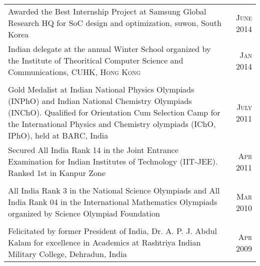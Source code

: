 \documentclass[a4paper,8pt]{article} %
\begin{document}
{\begin{tabular}{p{14.5cm}|r}
	\textbullet Awarded the Best Internship Project at Samsung Global Research HQ for SoC design and optimization, suwon, South Korea & \textsc{June 2014} \\ 
	\textbullet Indian delegate at the annual Winter School organized by the Institute of Theoritical Computer Science and Communications, CUHK, \textsc{Hong Kong} &\textsc{Jan 2014}\\
	\multicolumn{2}{c}{}\\
	\textbullet Gold Medalist at Indian National Physics Olympiads (INPhO) and Indian National Chemistry Olympiads (INChO). Qualified for Orientation Cum Selection Camp for the International Physics and Chemistry olympiads (IChO, IPhO), held at BARC, India & \textsc{July 2011}\\
	\textbullet Secured All India Rank 14 in the Joint Entrance Examination for Indian Institutes of Technology (IIT-JEE). Ranked 1st in Kanpur Zone & \textsc{Apr 2011}\\
	\multicolumn{2}{c}{}\\
	\textbullet All India Rank 3 in the National Science Olympiads and All India Rank 04 in the International Mathematics Olympiads organized by Science Olympiad Foundation& \textsc{Mar 2010}\\
	\multicolumn{2}{c}{}\\
	\textbullet Felicitated by former President of India, Dr. A. P. J. Abdul Kalam for excellence in Academics  at Rashtriya Indian Military College, Dehradun, India & \textsc{Apr 2009}\\
\end{tabular}


}
\end{document}
